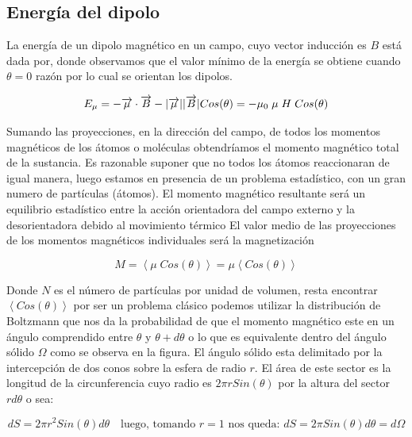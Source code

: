 \subsection{Energía del dipolo}

La energía de un dipolo magnético en un campo, cuyo vector inducción es $B$ está dada por, donde observamos que el valor mínimo de la energía se obtiene cuando $\theta=0$ razón por lo cual se orientan los dipolos.

\begin{equation}
	E_{\mu}=-\overrightarrow{\mu}\cdot\overrightarrow{B} -\vert \overrightarrow{\mu} \vert\vert \overrightarrow{B} \vert Cos(\theta) =-\mu_{0}\;\mu\;H\;Cos(\theta)
\end{equation}

Sumando las proyecciones, en la dirección del campo, de todos los momentos magnéticos de los átomos o moléculas obtendríamos el momento magnético total de la sustancia. Es razonable suponer que no todos los átomos reaccionaran de igual manera, luego estamos en presencia de un problema estadístico, con un gran numero de partículas (átomos). El momento magnético resultante será un equilibrio estadístico entre la acción orientadora del campo externo y la desorientadora debido al movimiento térmico El valor medio de las proyecciones de los momentos magnéticos individuales será la magnetización

\begin{equation}
	M=\left\langle \mu\;Cos(\theta) \right\rangle =\mu \left\langle Cos(\theta) \right\rangle
\end{equation}

Donde $N$ es el número de partículas por unidad de volumen, resta encontrar $\left\langle Cos(\theta) \right\rangle$ por ser un problema clásico podemos utilizar la distribución de Boltzmann que nos da la probabilidad de que el momento magnético este en un ángulo comprendido entre $\theta$ y $\theta + d\theta$ o lo que es equivalente dentro del ángulo sólido $\Omega$ como se observa en la figura. El ángulo sólido esta delimitado por la intercepción de dos conos sobre la esfera de radio $r$. El área de este sector es la longitud de la circunferencia cuyo radio es $2\pi r Sin(\theta)$ por la altura del sector $rd\theta$ o sea:

\begin{equation*}
	dS=2\pi r^{2}Sin(\theta)d\theta \quad \text{luego, tomando $r=1$ nos queda: } dS=2\pi Sin(\theta)d\theta = d\Omega
\end{equation*}

